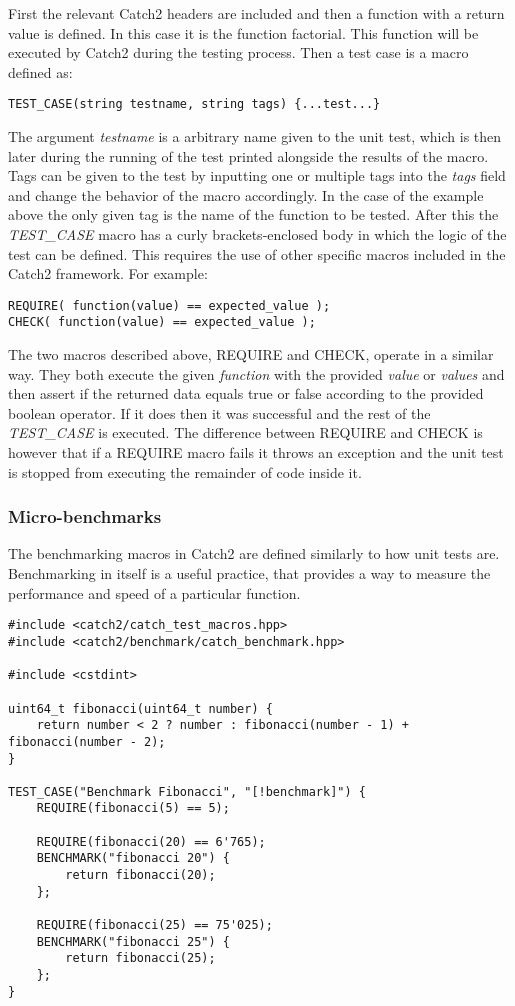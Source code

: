 First the relevant Catch2 headers are included and then a function with a return value is defined. In this case it is the function factorial. 
This function will be executed by Catch2 during the testing process. Then a test case is a macro defined as:

\begin{verbatim}
TEST_CASE(string testname, string tags) {...test...}
\end{verbatim}

The argument \textit{testname} is a arbitrary name given to the unit test, which is then later during the running of the test printed alongside the results of the macro.
Tags can be given to the test by inputting one or multiple tags into the \textit{tags} field and change the behavior of the macro accordingly. In the case of the example above
the only given tag is the name of the function to be tested. After this the \textit{TEST\_CASE} macro has a curly brackets-enclosed body in which the logic of the test can 
be defined.
This requires the use of other specific macros included in the Catch2 framework. For example:

\begin{verbatim}
REQUIRE( function(value) == expected_value );
CHECK( function(value) == expected_value );
\end{verbatim}

The two macros described above, REQUIRE and CHECK, operate in a similar way. They both execute the given \textit{function} with the provided \textit{value} or \textit{values}
and then assert if the returned data equals true or false according to the provided boolean operator. If it does then it was successful and the rest of the \textit{TEST\_CASE} is executed. The difference 
between REQUIRE and CHECK is however that if a REQUIRE macro fails it throws an exception and the unit test is stopped from executing the remainder of code inside it.

\subsubsection{Micro-benchmarks}
The benchmarking macros in Catch2 are defined similarly to how unit tests are. Benchmarking in itself is a useful practice, that provides a way to measure the performance
and speed of a particular function.

\begin{verbatim}
#include <catch2/catch_test_macros.hpp>
#include <catch2/benchmark/catch_benchmark.hpp>

#include <cstdint>

uint64_t fibonacci(uint64_t number) {
    return number < 2 ? number : fibonacci(number - 1) + fibonacci(number - 2);
}

TEST_CASE("Benchmark Fibonacci", "[!benchmark]") {
    REQUIRE(fibonacci(5) == 5);

    REQUIRE(fibonacci(20) == 6'765);
    BENCHMARK("fibonacci 20") {
        return fibonacci(20);
    };

    REQUIRE(fibonacci(25) == 75'025);
    BENCHMARK("fibonacci 25") {
        return fibonacci(25);
    };
}
\end{verbatim}

